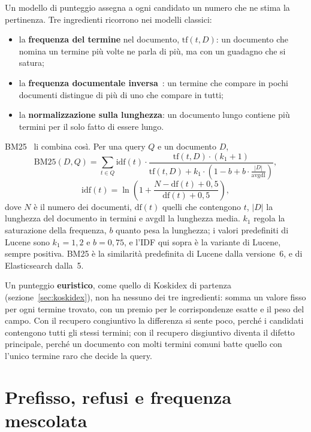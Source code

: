 Un modello di punteggio assegna a ogni candidato un numero che ne stima la
pertinenza. Tre ingredienti ricorrono nei modelli classici:
\begin{itemize}
  \item la \textbf{frequenza del termine} nel documento, $\text{tf}(t, D)$: un
        documento che nomina un termine più volte ne parla di più, ma con un
        guadagno che si satura;
  \item la \textbf{frequenza documentale inversa}~\cite{sparckjones1972idf}: un
        termine che compare in pochi documenti distingue di più di uno che
        compare in tutti;
  \item la \textbf{normalizzazione sulla lunghezza}: un documento lungo contiene
        più termini per il solo fatto di essere lungo.
\end{itemize}

BM25~\cite{robertson2009bm25} li combina così. Per una query $Q$ e un documento
$D$,
\[
  \text{BM25}(D, Q) = \sum_{t \in Q} \text{idf}(t) \cdot
  \frac{\text{tf}(t, D) \cdot (k_1 + 1)}
       {\text{tf}(t, D) + k_1 \cdot \left(1 - b + b \cdot \frac{|D|}{\text{avgdl}}\right)},
\]
\[
  \text{idf}(t) = \ln\left(1 + \frac{N - \text{df}(t) + 0{,}5}{\text{df}(t) + 0{,}5}\right),
\]
dove $N$ è il numero dei documenti, $\text{df}(t)$ quelli che contengono $t$,
$|D|$ la lunghezza del documento in termini e avgdl la lunghezza media. $k_1$
regola la saturazione della frequenza, $b$ quanto pesa la lunghezza; i valori
predefiniti di Lucene sono $k_1 = 1{,}2$ e $b = 0{,}75$, e l'IDF qui sopra è la
variante di Lucene, sempre positiva. BM25 è la similarità predefinita di Lucene dalla
versione~6, e di Elasticsearch dalla~5.

Un punteggio \textbf{euristico}, come quello di Koskidex di partenza
(sezione~\ref{sec:koskidex}), non ha nessuno dei tre ingredienti: somma un
valore fisso per ogni termine trovato, con un premio per le corrispondenze esatte
e il peso del campo. Con il recupero congiuntivo la differenza si sente poco,
perché i candidati contengono tutti gli stessi termini; con il recupero
disgiuntivo diventa il difetto principale, perché un documento con molti termini
comuni batte quello con l'unico termine raro che decide la query.

\section{Prefisso, refusi e frequenza mescolata}\label{sec:espansioni-teoria}

